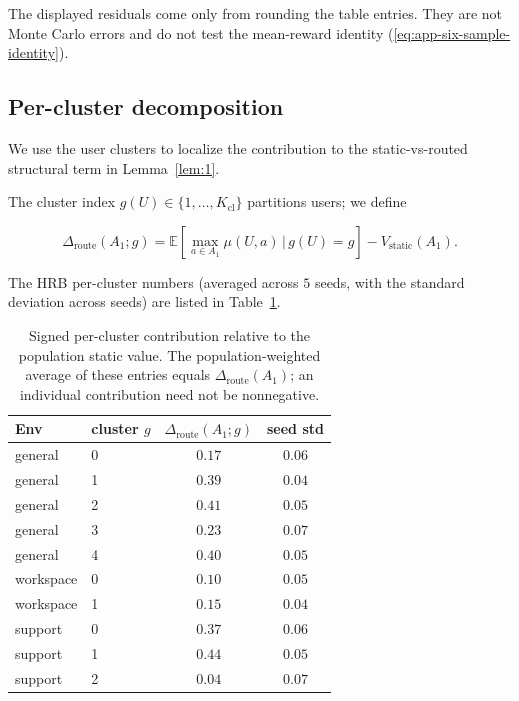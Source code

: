 \documentclass{article} %
\renewcommand{\eqref}[1]{\textup{(\ref{#1})}}
\begin{document}
The displayed residuals come only from rounding the table entries. They are
not Monte Carlo errors and do not test the mean-reward identity
\eqref{eq:app-six-sample-identity}.

\subsection{Per-cluster decomposition}

\label{app:per-cluster}

We use the user clusters to localize the contribution to the static-vs-routed
structural term in Lemma~\ref{lem:1}.

The cluster index
\(g(U)\in\{1,\dots,K_{\mathrm{cl}}\}\) partitions users; we define

\begin{equation}
\label{eq:app-per-cluster-het}
\Delta_{\mathrm{route}}(A_1;g) = \mathbb{E}\!\left[\max_{a\in A_1}\mu(U,a)\,\bigg|\,g(U)=g\right] - V_{\mathrm{static}}(A_1).
\end{equation}

The HRB per-cluster numbers (averaged across $5$ seeds, with the standard deviation across seeds) are listed in Table~\ref{tab:app-per-cluster}.

\begin{table}[h]
\centering
\footnotesize
\setlength{\tabcolsep}{4pt}
\begin{tabular}{llcc}
\toprule
Env & cluster $g$ & $\Delta_{\mathrm{route}}(A_1;g)$ & seed std \\
\midrule
general    & 0 & $0.17$ & $0.06$ \\
general    & 1 & $0.39$ & $0.04$ \\
general    & 2 & $0.41$ & $0.05$ \\
general    & 3 & $0.23$ & $0.07$ \\
general    & 4 & $0.40$ & $0.05$ \\
\midrule
workspace  & 0 & $0.10$ & $0.05$ \\
workspace  & 1 & $0.15$ & $0.04$ \\
\midrule
support    & 0 & $0.37$ & $0.06$ \\
support    & 1 & $0.44$ & $0.05$ \\
support    & 2 & $0.04$ & $0.07$ \\
\bottomrule
\end{tabular}
\caption{Signed per-cluster contribution relative to the population static
value. The population-weighted average of these entries equals
\(\Delta_{\mathrm{route}}(A_1)\); an individual contribution need not be
nonnegative.}
\label{tab:app-per-cluster}
\end{table}
\end{document}
